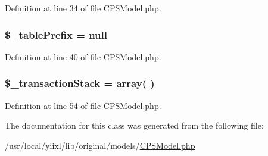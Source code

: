 Definition at line 34 of file CPSModel.php.

\hypertarget{classCPSModel_a58d5dd151fa6e7f7841d9d85a6a6c273}{
\subsubsection[{\$\_\-tablePrefix}]{\setlength{\rightskip}{0pt plus 5cm}\$\_\-tablePrefix = null}}
\label{classCPSModel_a58d5dd151fa6e7f7841d9d85a6a6c273}


Definition at line 40 of file CPSModel.php.

\hypertarget{classCPSModel_a3cff4c1c690782176edb1e27b4d602a1}{
\subsubsection[{\$\_\-transactionStack}]{\setlength{\rightskip}{0pt plus 5cm}\$\_\-transactionStack = {\bf array}( )}}
\label{classCPSModel_a3cff4c1c690782176edb1e27b4d602a1}


Definition at line 54 of file CPSModel.php.



The documentation for this class was generated from the following file:\begin{DoxyCompactItemize}
\item 
/usr/local/yiixl/lib/original/models/\hyperlink{CPSModel_8php}{CPSModel.php}\end{DoxyCompactItemize}
